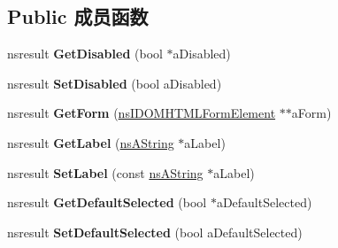 \subsection*{Public 成员函数}
\begin{DoxyCompactItemize}
\item 
\mbox{\label{interfacens_i_d_o_m_h_t_m_l_option_element_a9624459cd836b9ca5ad97b414f5b8231}} 
nsresult {\bfseries Get\+Disabled} (bool $\ast$a\+Disabled)
\item 
\mbox{\label{interfacens_i_d_o_m_h_t_m_l_option_element_ac4f26be689a96fdc2f53d2c4139b8798}} 
nsresult {\bfseries Set\+Disabled} (bool a\+Disabled)
\item 
\mbox{\label{interfacens_i_d_o_m_h_t_m_l_option_element_a4fa8808e1e33e0b2cf491357726336e2}} 
nsresult {\bfseries Get\+Form} (\hyperlink{interfacens_i_d_o_m_h_t_m_l_form_element}{ns\+I\+D\+O\+M\+H\+T\+M\+L\+Form\+Element} $\ast$$\ast$a\+Form)
\item 
\mbox{\label{interfacens_i_d_o_m_h_t_m_l_option_element_a0162b7103f5e67f4fc628a07e7f9caa7}} 
nsresult {\bfseries Get\+Label} (\hyperlink{structns_string_container}{ns\+A\+String} $\ast$a\+Label)
\item 
\mbox{\label{interfacens_i_d_o_m_h_t_m_l_option_element_a86a8d15e7285e2a37efe154f2418f411}} 
nsresult {\bfseries Set\+Label} (const \hyperlink{structns_string_container}{ns\+A\+String} $\ast$a\+Label)
\item 
\mbox{\label{interfacens_i_d_o_m_h_t_m_l_option_element_a7f05e368ea9b8e2d46bec5d391608b99}} 
nsresult {\bfseries Get\+Default\+Selected} (bool $\ast$a\+Default\+Selected)
\item 
\mbox{\label{interfacens_i_d_o_m_h_t_m_l_option_element_af5540b90403afe6bb18e54a1b4a18a1e}} 
nsresult {\bfseries Set\+Default\+Selected} (bool a\+Default\+Selected)
\item 
\mbox{\label{interfacens_i_d_o_m_h_t_m_l_option_element_acb4e526dec5dad987193cbd90d00d8e4}} 
$$
\end{DoxyCompactItemize}
